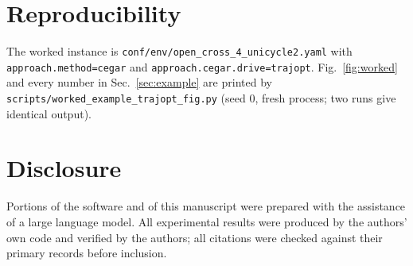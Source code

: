 \documentclass[conference]{IEEEtran}
\theoremstyle{plain}
\theoremstyle{definition}
\begin{document}
\section*{Reproducibility}

The worked instance is \texttt{conf/env/open\_cross\_4\_unicycle2.yaml} with
\texttt{approach.method=cegar} and \texttt{approach.cegar.drive=trajopt}. Fig.~\ref{fig:worked}
and every number in Sec.~\ref{sec:example} are printed by
\texttt{scripts/worked\_example\_trajopt\_fig.py} (seed $0$, fresh process; two runs give
identical output).

\section*{Disclosure}

Portions of the software and of this manuscript were prepared with the assistance of a large
language model. All experimental results were produced by the authors' own code and verified
by the authors; all citations were checked against their primary records before inclusion.



\end{document}
